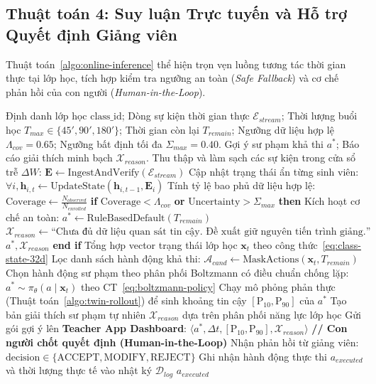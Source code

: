 \subsection{Thuật toán 4: Suy luận Trực tuyến và Hỗ trợ Quyết định Giảng viên}\label{subsec:algo-online-inference}
Thuật toán~\ref{algo:online-inference} thể hiện trọn vẹn luồng tương tác thời gian thực tại lớp học, tích hợp kiểm tra ngưỡng an toàn (\textit{Safe Fallback}) và cơ chế phản hồi của con người (\textit{Human-in-the-Loop}).

\begin{algorithm}[H]
\caption{Vòng lặp Suy luận Trực tuyến \& Hỗ trợ Quyết định Giảng viên}\label{algo:online-inference}
\begin{algorithmic}[1]
\Require Định danh lớp học $\text{class\_id}$; Dòng sự kiện thời gian thực $\mathcal{E}_{stream}$; Thời lượng buổi học $T_{max} \in \{45', 90', 180'\}$; Thời gian còn lại $T_{remain}$; Ngưỡng dữ liệu hợp lệ $\Lambda_{cov} = 0.65$; Ngưỡng bất định tối đa $\Sigma_{max} = 0.40$.
\Ensure Gợi ý sư phạm khả thi $a^*$; Báo cáo giải thích minh bạch $\mathcal{X}_{reason}$.
\State Thu thập và làm sạch các sự kiện trong cửa sổ trễ $\Delta W$: $\mathbf{E} \leftarrow \text{IngestAndVerify}(\mathcal{E}_{stream})$
\State Cập nhật trạng thái ẩn từng sinh viên: $\forall i, \mathbf{h}_{i, t} \leftarrow \text{UpdateState}(\mathbf{h}_{i, t-1}, \mathbf{E}_i)$
\State Tính tỷ lệ bao phủ dữ liệu hợp lệ: $\text{Coverage} \leftarrow \frac{N_{observed}}{N_{enrolled}}$
\State \textbf{if} $\text{Coverage} < \Lambda_{cov}$ \textbf{or} $\text{Uncertainty} > \Sigma_{max}$ \textbf{then}
    \State Kích hoạt cơ chế an toàn: $a^* \leftarrow \text{RuleBasedDefault}(T_{remain})$
    \State $\mathcal{X}_{reason} \leftarrow \text{``Chưa đủ dữ liệu quan sát tin cậy. Đề xuất giữ nguyên tiến trình giảng.''}$
    \State \Return $a^*, \mathcal{X}_{reason}$
\State \textbf{end if}
\State Tổng hợp vector trạng thái lớp học $\mathbf{x}_t$ theo công thức~\eqref{eq:class-state-32d}
\State Lọc danh sách hành động khả thi: $\mathcal{A}_{cand} \leftarrow \text{MaskActions}(\mathbf{x}_t, T_{remain})$
\State Chọn hành động sư phạm theo phân phối Boltzmann có điều chuẩn chống lặp: $a^* \sim \pi_\theta(a \mid \mathbf{x}_t)$ theo CT~\eqref{eq:boltzmann-policy}
\State Chạy mô phỏng phản thực (Thuật toán~\ref{algo:twin-rollout}) để sinh khoảng tin cậy $[\text{P}_{10}, \text{P}_{90}]$ của $a^*$
\State Tạo bản giải thích sư phạm tự nhiên $\mathcal{X}_{reason}$ dựa trên phân phối năng lực lớp học
\State Gửi gói gợi ý lên \textbf{Teacher App Dashboard}: $\langle a^*, \Delta t, [\text{P}_{10}, \text{P}_{90}], \mathcal{X}_{reason} \rangle$
\State \textbf{// Con người chốt quyết định (Human-in-the-Loop)}
\State Nhận phản hồi từ giảng viên: $\text{decision} \in \{\text{ACCEPT}, \text{MODIFY}, \text{REJECT}\}$
\State Ghi nhận hành động thực thi $a_{executed}$ và thời lượng thực tế vào nhật ký $\mathcal{D}_{log}$
\State \Return $a_{executed}$
\end{algorithmic}
\end{algorithm}

